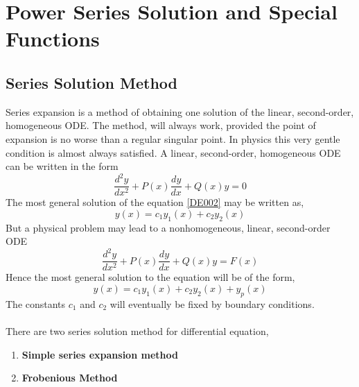 \chapter{Power Series Solution and Special Functions}
\section{Series Solution Method}
Series expansion is a  method of obtaining one solution of the linear, second-order, homogeneous ODE. The method, will always work, provided the point of expansion is no worse than a regular singular point. In physics this very gentle condition is almost always satisfied. 
A linear, second-order, homogeneous ODE can be written in the form
\begin{equation}
\frac{d^{2} y}{d x^{2}}+P(x) \frac{d y}{d x}+Q(x) y=0 \label{DE002}
\end{equation}
The most general solution of the equation \ref{DE002} may be written as,
\begin{equation}
y(x)=c_{1} y_{1}(x)+c_{2} y_{2}(x)
\end{equation}
But a physical problem may lead to a nonhomogeneous, linear, second-order ODE
\begin{equation}
\frac{d^{2} y}{d x^{2}}+P(x) \frac{d y}{d x}+Q(x) y=F(x)\label{DE003}
\end{equation}
Hence the most general solution to the equation \label{DE003} will be of the form,
\begin{equation}
y(x)=c_{1} y_{1}(x)+c_{2} y_{2}(x)+y_{p}(x)
\end{equation}
The constants $c_{1}$ and $c_{2}$ will eventually be fixed by boundary conditions.\\\\
There are two series solution method  for differential equation,
\begin{enumerate}
	\item \textbf{Simple series expansion method}
	\item \textbf{Frobenious Method}
\end{enumerate}
